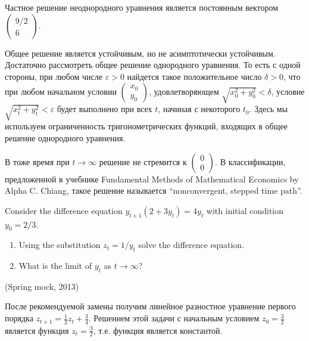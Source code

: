 \begin{problem}
\begin{sol}
 Частное решение неоднородного уравнения является постоянным вектором $\left(\begin{array}{c} {9/2} \\ {6} \end{array}\right)$.


Общее решение является устойчивым, но не асимптотически устойчивым.  Достаточно рассмотреть общее решение однородного уравнения. То есть с одной стороны, при любом числе $\varepsilon>0$ найдется такое положительное число $\delta>0$, что при любом начальном условии
$
\begin{pmatrix}
x_0 \\
y_0
\end{pmatrix}
$,
удовлетворяющем $\sqrt{x_0^2+y_0^2}<\delta$, условие $\sqrt{x_t^2+y_t^2}<\varepsilon$ будет выполнено при всех $t$, начиная с некоторого $t_0$. Здесь мы используем ограниченность тригонометрических функций, входящих в общее решение однородного уравнения.




В тоже время при $t\to \infty $ решение не стремится к $\left(\begin{array}{c} {0} \\ {0} \end{array}\right)$. В классификации, предложенной в учебнике Fundamental Methods of Mathematical Economics by Alpha C. Chiang, такое решение называется ``nonconvergent, stepped time path''.
\end{sol}
\end{problem}


\begin{problem}
Consider the difference equation $y_{t+1}(2+3y_t)=4y_t$ with initial condition $y_0=2/3$.
\begin{enumerate}
\item Using the substitution $z_t=1/y_t$ solve the difference equation.
\item What is the limit of $y_t$ as $t\to\infty$?
\end{enumerate}
(Spring mock, 2013)


\begin{sol}
После рекомендуемой замены получим линейное разностное уравнение первого порядка  $z_{t+1}=\frac{1}{2}z_t+\frac{3}{4}$. Решением этой задачи с начальным условием $z_0=\frac{3}{2}$ является функция $z_t=\frac{3}{2}$, т.е. функция является константой.
\end{sol}
\end{problem}



